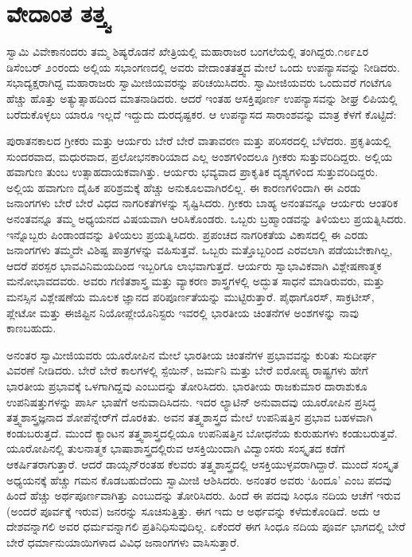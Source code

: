 
\chapter{ವೇದಾಂತ ತತ್ತ್ವ}

ಸ್ವಾಮಿ ವಿವೇಕಾನಂದರು ತಮ್ಮ ಶಿಷ್ಯರೊಡನೆ ಖೇತ್ರಿಯಲ್ಲಿ ಮಹಾರಾಜರ ಬಂಗಲೆಯಲ್ಲಿ ತಂಗಿದ್ದರು.೧೮೯೭ರ ಡಿಸೆಂಬರ್​ ೨೦ರಂದು ಅಲ್ಲಿಯ ಸಭಾಂಗಣದಲ್ಲಿ ಅವರು ವೇದಾಂತತತ್ತ್ವದ ಮೇಲೆ ಒಂದು ಉಪನ್ಯಾಸವನ್ನು ನೀಡಿದರು. ಸಭಾದ್ಯಕ್ಷರಾಗಿದ್ದ ಮಹಾರಾಜರು ಸ್ವಾಮೀಜಿಯವರನ್ನು ಪರಿಚಯಿಸಿದರು. ಸ್ವಾಮೀಜಿಯವರು ಒಂದುವರೆ ಗಂಟೆಗೂ ಹೆಚ್ಚು ಹೊತ್ತು ಅತ್ಯುತ್ಸಾಹದಿಂದ ಮಾತನಾಡಿದರು. ಆದರೆ ಇಂತಹ ಆಸಕ್ತಿಪೂರ್ಣ ಉಪನ್ಯಾಸವನ್ನು ಶೀಘ್ರ ಲಿಪಿಯಲ್ಲಿ ಬರೆದುಕೊಳ್ಳಲು ಯಾರೂ ಇಲ್ಲದೆ ಇದ್ದುದು ದುರದೃಷ್ಟಕರ. ಆ ಉಪನ್ಯಾಸದ ಸಾರಾಂಶವನ್ನು ಮಾತ್ರ ಕೆಳಗೆ ಕೊಟ್ಟಿದೆ:

ಪುರಾತನಕಾಲದ ಗ್ರೀಕರು ಮತ್ತು ಆರ್ಯರು ಬೇರೆ ಬೇರೆ ವಾತಾವರಣ ಮತ್ತು ಪರಿಸರದಲ್ಲಿ ಬೆಳೆದರು. ಪ್ರಕೃತಿಯಲ್ಲಿ ಸುಂದರವಾದ, ಮಧುರವಾದ, ಪ್ರಲೋಭನಕಾರಿಯಾದ ಎಲ್ಲ ಅಂಶಗಳಿಂದಲೂ ಗ್ರೀಕರು ಸುತ್ತುವರಿದಿದ್ದರು. ಅಲ್ಲಿಯ ಹವಾಗುಣ ತುಂಬ ಉತ್ಸಾಹದಾಯಕವಾಗಿತ್ತು. ಆರ್ಯರು ಭವ್ಯವಾದ ಪ್ರಾಕೃತಿಕ ದೃಶ್ಯಗಳಿಂದ ಸುತ್ತುವರಿದಿದ್ದರು. ಅಲ್ಲಿಯ ಹವಾಗುಣ ದೈಹಿಕ ಪರಿಶ್ರಮಕ್ಕೆ ಹೆಚ್ಚು ಅನುಕೂಲವಾಗಿರಲಿಲ್ಲ. ಈ ಕಾರಣಗಳಿಂದಾಗಿ ಈ ಎರಡು ಜನಾಂಗಗಳು ಬೇರೆ ಬೇರೆ ವಿಧದ ನಾಗರಿಕತೆಗಳನ್ನು ಸೃಷ್ಟಿಸಿದರು. ಗ್ರೀಕರು ಬಾಹ್ಯ ಅನಂತವನ್ನೂ ಆರ್ಯರು ಆಂತರಿಕ ಅನಂತವನ್ನೂ ತಮ್ಮ ಅಧ್ಯಯನದ ವಿಷಯವಾಗಿ ಆರಿಸಿಕೊಂಡರು. ಒಬ್ಬರು ಬ್ರಹ್ಮಾಂಡವನ್ನು ತಿಳಿಯಲು ಪ್ರಯತ್ನಿಸಿದರು. ಇನ್ನೊಬ್ಬರು ಪಿಂಡಾಂಡವನ್ನು ತಿಳಿಯಲು ಪ್ರಯತ್ನಿಸಿದರು. ಪ್ರಪಂಚದ ನಾಗರಿಕತೆಯ ವಿಕಾಸದಲ್ಲಿ ಈ ಎರಡು ಜನಾಂಗಗಳು ತಮ್ಮದೇ ವಿಶಿಷ್ಟ ಪಾತ್ರಗಳನ್ನು ವಹಿಸುತ್ತವೆ. ಒಬ್ಬರು ಮತ್ತೊಬ್ಬರಿಂದ ಎರವಲಾಗಿ ಪಡೆಯಬೇಕಾಗಿಲ್ಲ, ಆದರೆ ಪರಸ್ಪರ ಭಾವವಿನಿಮಯದಿಂದ ಇಬ್ಬರಿಗೂ ಲಾಭವಾಗುತ್ತದೆ. ಆರ್ಯರು ಸ್ವಾಭಾವಿಕವಾಗಿ ವಿಶ್ಲೇಷಣಾತ್ಮಕ ಮನೋಭಾವದವರು. ಅವರು ಗಣಿತಶಾಸ್ತ್ರ ಮತ್ತು ವ್ಯಾಕರಣ ಶಾಸ್ತ್ರಗಳಲ್ಲಿ ಅದ್ಭುತ ಸಾಧನೆ ಮಾಡಿರುವರು, ಮತ್ತು ಮನಸ್ಸಿನ ವಿಶ್ಲೇಷಣೆಯ ಮೂಲಕ ಜ್ಞಾನದ ಪರಿಪೂರ್ಣತೆಯನ್ನು ಮುಟ್ಟಿರುತ್ತಾರೆ. ಪೈಥಾಗೊರಸ್​, ಸಾಕ್ರಟೀಸ್​, ಪ್ಲೇಟೋ ಮತ್ತು ಈಜಿಪ್ಟಿನ ನಿಯೋಪ್ಲೇಯೊನಿಸ್ಟರು ಇವರಲ್ಲಿ ಭಾರತೀಯ ಚಿಂತನೆಗಳ ಅಂಶಗಳನ್ನು ನಾವು ಕಾಣಬಹುದು.

ಅನಂತರ ಸ್ವಾಮೀಜಿಯವರು ಯೂರೋಪಿನ ಮೇಲೆ ಭಾರತೀಯ ಚಿಂತನೆಗಳ ಪ್ರಭಾವವನ್ನು ಕುರಿತು ಸುದೀರ್ಘ ವಿವರಣೆ ನೀಡಿದರು. ಬೇರೆ ಬೇರೆ ಕಾಲಗಳಲ್ಲಿ ಸ್ಪೆಯಿನ್​, ಜರ್ಮನಿ ಮತ್ತು ಬೇರೆ ಐರೋಪ್ಯ ರಾಷ್ಟ್ರಗಳು ಹೇಗೆ ಭಾರತೀಯ ಪ್ರಭಾವಕ್ಕೆ ಒಳಗಾಗಿದ್ದವು ಎಂಬುದನ್ನು ತೋರಿಸಿದರು. ಭಾರತೀಯ ರಾಜಕುಮಾರ ದಾರಾಶುಕೂ ಉಪನಿಷತ್ತುಗಳನ್ನು ಪಾರ್ಸಿ ಭಾಷೆಗೆ ಅನುವಾದಿಸಿದನು. ಇದರ ಲ್ಯಾಟಿನ್​ ಅನುವಾದವು ಯೂರೋಪಿನ ಪ್ರಸಿದ್ಧ ತತ್ತ್ವಶಾಸ್ತ್ರಜ್ಞನಾದ ಶೋಪೆನ್ನೇರ್​ಗೆ ದೊರಕಿತು. ಅವನ ತತ್ತ್ವಶಾಸ್ತ್ರದ ಮೇಲೆ ಉಪನಿಷತ್ತಿನ ಪ್ರಭಾವ ಬಹಳವಾಗಿ ಕಂಡುಬರುತ್ತದೆ. ಮುಂದೆ ಕ್ಯಾಂಟನ ತತ್ತ್ವಶಾಸ್ತ್ರದಲ್ಲಿಯೂ ಉಪನಿಷತ್ತಿನ ಬೋಧನೆಯ ಕುರುಹುಗಳು ಕಂಡುಬರುತ್ತವೆ. ಯೂರೋಪಿನಲ್ಲಿ ತುಲನಾತ್ಮಕ ಭಾಷಾಶಾಸ್ತ್ರದಲ್ಲಿರುವ ಆಸಕ್ತಿಯಿಂದಾಗಿ ವಿದ್ವಾಂಸರು ಸಂಸ್ಕೃತದ ಕಡೆಗೆ ಆಕರ್ಷಿತರಾಗುತ್ತಾರೆ. ಆದರೆ ಡಾಯ್ಸನ್​ರಂತಹ ಕೆಲವರು ತತ್ತ್ವಶಾಸ್ತ್ರದಲ್ಲಿ ಆಸಕ್ತಿಯುಳ್ಳವರಾಗಿದ್ದಾರೆ. ಮುಂದೆ ಸಂಸ್ಕೃತ ಅಧ್ಯಯನಕ್ಕೆ ಹೆಚ್ಚು ಗಮನ ಕೊಡಬಹುದೆಂದು ಸ್ವಾಮೀಜಿ ಆಶಿಸಿದರು. ಅನಂತರ ಅವರು ‘ಹಿಂದೂ’ ಎಂಬ ಪದವು ಹಿಂದೆ ಹೆಚ್ಚು ಅರ್ಥಪೂರ್ಣವಾಗಿತ್ತು ಎಂಬುದನ್ನು ತೋರಿಸಿದರು. ಹಿಂದೆ ಈ ಪದವು ಸಿಂಧೂ ನದಿಯ ಆಚೆಗೆ ಇರುವ (ಅಂದರೆ ಪೂರ್ವಕ್ಕೆ ಇರುವ) ಜನರನ್ನು ಸೂಚಿಸುತ್ತಿತ್ತು. ಈಗ ಇದು ಆ ಅರ್ಥವನ್ನು ಕಳೆದುಕೊಂಡಿದೆ. ಅದು ಆ ದೇಶವನ್ನಾಗಲಿ ಅವರ ಧರ್ಮವನ್ನಾಗಲಿ ಪ್ರತಿನಿಧಿಸುವುದಿಲ್ಲ. ಏಕೆಂದರೆ ಈಗ ಸಿಂಧೂ ನದಿಯ ಪೂರ್ವ ಭಾಗದಲ್ಲಿ ಬೇರೆ ಬೇರೆ ಧರ್ಮಾನುಯಾಯಿಗಳಾದ ವಿವಿಧ ಜನಾಂಗಗಳು ವಾಸಿಸುತ್ತಾರೆ.

